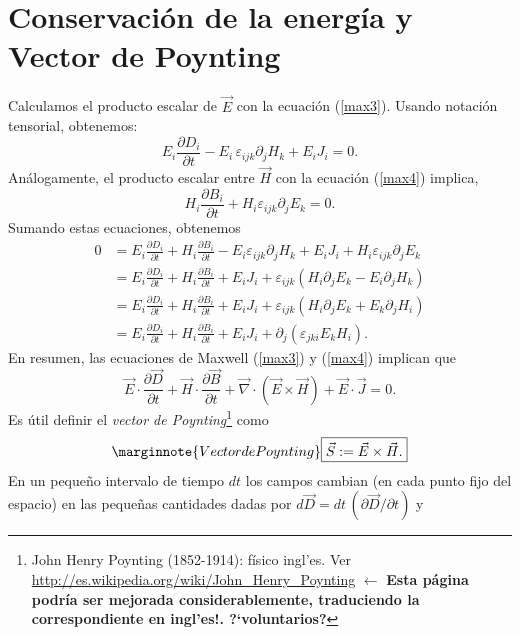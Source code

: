 \section{Conservación de la energía y Vector de Poynting}\label{sec:energia}
Calculamos el producto escalar de $\vec{E}$ con la ecuación (\ref{max3}).
Usando notación tensorial, obtenemos:
\begin{equation}
 E_i\frac{\partial D_i}{\partial t}
-E_i\,\varepsilon_{ijk}\partial_jH_k+E_iJ_i=0.
\end{equation}
Análogamente, el producto escalar entre $\vec{H}$ con la ecuación
(\ref{max4}) implica,
\begin{equation}
H_i\frac{\partial B_i}{\partial t} +H_i\varepsilon_{ijk}\partial_jE_k=0.
\end{equation}
Sumando estas ecuaciones, obtenemos
\begin{align}
0 &= E_i\frac{\partial D_i}{\partial t}+H_i\frac{\partial B_i}{\partial t}
-E_i\varepsilon_{ijk}\partial_jH_k+E_iJ_i+H_i\varepsilon
_{ijk}\partial_jE_k\\
 &= E_i\frac{\partial D_i}{\partial t}+H_i\frac{\partial B_i}{\partial
t}+E_iJ_i+\varepsilon_{ijk}\left(H_i\partial_jE_k-E_i\partial_jH_k\right)\\
 &= E_i\frac{\partial D_i}{\partial t}+H_i\frac{\partial B_i}{\partial
t}+E_iJ_i+\varepsilon_{ijk}\left(H_i\partial_jE_k+E_k\partial_jH_i\right)\\
 &= E_i\frac{\partial D_i}{\partial t}+H_i\frac{\partial B_i}{\partial
t}+E_iJ_i+\partial_j(\varepsilon_{jki}E_kH_i).
\end{align}
En resumen, las ecuaciones de Maxwell (\ref{max3}) y (\ref{max4}) implican que
\begin{equation}
\boxed{\vec{E}\cdot\frac{\partial \vec{D}}{\partial
t}+\vec{H}\cdot\frac{\partial\vec{B}}{\partial t}+
\vec\nabla\cdot(\vec{E}\times\vec{H})
+\vec{E}\cdot\vec{J}=0.} \label{cEem0}
\end{equation}
Es útil definir el \textit{vector de Poynting}\footnote{John Henry Poynting (1852-1914): físico ingl'es. Ver \url{http://es.wikipedia.org/wiki/John_Henry_Poynting} $\leftarrow$ \textbf{Esta página podría ser mejorada considerablemente, traduciendo la correspondiente en ingl'es!. ?`voluntarios?}} como
\begin{equation}\label{defPoy}\marginnote{Vector de Poynting}
\boxed{\vec{S}:=\vec{E}\times\vec{H}.}
\end{equation}
En un pequeño intervalo de tiempo $dt$ los campos cambian (en cada punto fijo del espacio) en las pequeñas cantidades dadas por $d\vec{D}=dt\,({\partial \vec{D}}/{\partial t})$ y
